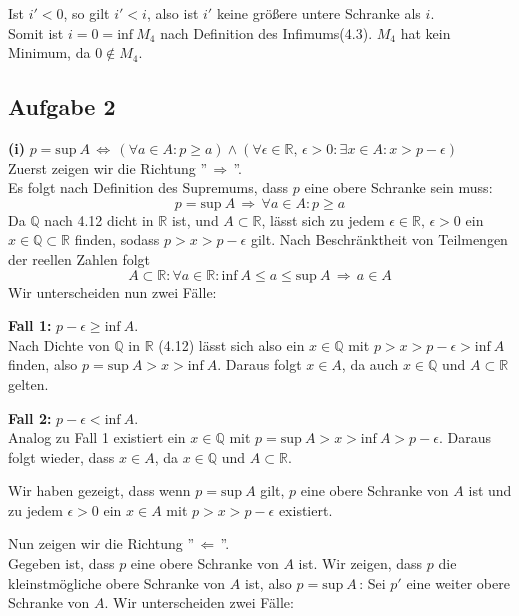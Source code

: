 \documentclass[a4paper,graphics,11pt]{article}
\newcommand{\aufgabe}[1]{\subsection*{Aufgabe #1}}
\begin{document}
Ist $i' < 0$, so gilt $i'<i$, also ist $i'$ keine größere untere Schranke als $i$.\\[5pt]
Somit ist $i = 0 = \text{inf}\ M_4$ nach Definition des Infimums(4.3). $M_4$ hat kein 
Minimum, da $0 \notin M_4$.
\aufgabe{2}
\textbf{(i)} $p = \text{sup}\ A \,\Longleftrightarrow\, (\forall a \in A\colon p\geq a)
\land (\forall \epsilon \in \mathbb{R},\, \epsilon > 0\colon
\exists x\in A\colon x>p-\epsilon)$\\

Zuerst zeigen wir die Richtung ''$\,\Longrightarrow\,$''.\\
Es folgt nach Definition des Supremums, dass $p$ eine obere Schranke sein muss:
$$ p = \text{sup}\ A \,\Longrightarrow\, \forall a \in A \colon p \geq a$$
Da $\mathbb{Q}$ nach 4.12 dicht in $\mathbb{R}$ ist, und $A\subset \mathbb{R}$, lässt sich zu jedem
$\epsilon \in \mathbb{R},\, \epsilon > 0$ ein $x \in \mathbb{Q} \subset \mathbb{R}$ finden,
sodass $p>x>p-\epsilon$ gilt.
Nach Beschränktheit von Teilmengen der reellen Zahlen folgt
$$
    A\subset \mathbb{R} \colon \forall a \in \mathbb{R} \colon \text{inf}\ A \leq a \leq \text{sup}\ A
    \,\Longrightarrow\,a \in A
$$
Wir unterscheiden nun zwei Fälle:

\textbf{Fall 1:} $p-\epsilon \geq \text{inf}\ A$.\\
Nach Dichte von $\mathbb{Q}$ in $\mathbb{R}$ (4.12) lässt sich also ein
$x\in \mathbb{Q}$ mit $p>x>p-\epsilon>\text{inf}\ A$ finden,
also $p = \text{sup}\ A > x > \text{inf}\ A$. Daraus folgt $x \in A$, da auch $x \in \mathbb{Q}$ und $A \subset \mathbb{R}$ gelten.

\textbf{Fall 2:} $p-\epsilon < \text{inf}\ A$.\\
Analog zu Fall 1 existiert ein $x \in \mathbb{Q}$ mit
$p = \text{sup}\ A > x > \text{inf}\ A > p-\epsilon$. Daraus folgt wieder,
dass $x \in A$, da $x \in \mathbb{Q}$ und $A \subset \mathbb{R}$.

Wir haben gezeigt, dass wenn $p = \text{sup}\ A$ gilt, $p$ eine obere Schranke von
$A$ ist und zu jedem $\epsilon > 0$ ein $x \in A$ mit $p>x>p-\epsilon$ existiert.

Nun zeigen wir die Richtung ''$\,\Longleftarrow\,$''.\\
Gegeben ist, dass $p$ eine obere Schranke von $A$ ist. Wir zeigen, dass $p$ die kleinstmögliche obere Schranke von $A$ ist, also $p = \text{sup}\ A$\,:
Sei $p'$ eine weiter obere Schranke von $A$. Wir unterscheiden zwei Fälle:

\newpage
\end{document}
